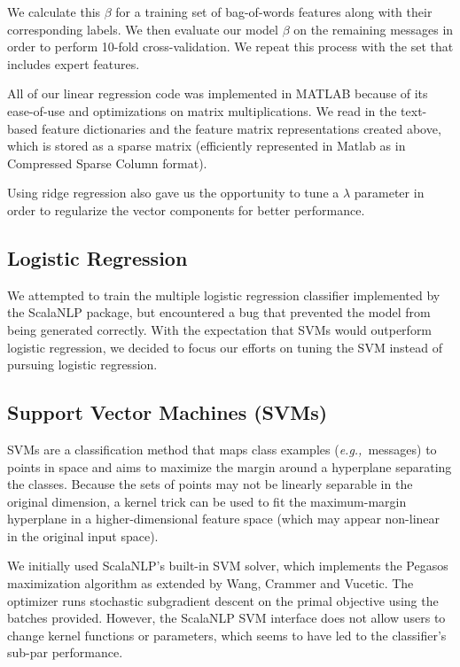 \documentclass[preprint]{acm_proc_article-sp}
\newcommand{\eg}{{\em e.g.,}~}
\begin{document}
We calculate this $\beta$ for a training set of bag-of-words features along with their corresponding labels. 
We then evaluate our model $\beta$ on the remaining messages in order to perform 10-fold cross-validation. 
We repeat this process with the set that includes expert features.

All of our linear regression code was implemented in MATLAB because of its ease-of-use 
and optimizations on matrix multiplications. We read in the text-based feature dictionaries and the feature matrix
representations created above, which is stored as a sparse matrix (efficiently represented in Matlab as 
in Compressed Sparse Column format).

Using ridge regression also gave us the opportunity to tune a $\lambda$ parameter in order to 
regularize the vector components for better performance. 

\subsection{Logistic Regression}

We attempted to train the multiple logistic regression classifier implemented by the ScalaNLP package, 
but encountered a bug that prevented the model from being generated correctly. With the expectation 
that SVMs would outperform logistic regression, we decided to focus our efforts on tuning the SVM 
instead of pursuing logistic regression. 

\subsection{Support Vector Machines (SVMs)}

SVMs are a classification method that maps class examples (\eg messages) to points 
in space and aims to maximize the margin around a hyperplane separating the classes.\cite{boser, cortesv95} 
Because the sets of points may not be linearly separable in the original dimension, a kernel trick can 
be used to fit the maximum-margin hyperplane in a higher-dimensional feature space (which may appear 
non-linear in the original input space).

We initially used ScalaNLP's built-in SVM solver, which implements the Pegasos maximization algorithm\cite{pegasos} 
as extended by Wang, Crammer and Vucetic\cite{wang2}. 
The optimizer runs stochastic subgradient descent on the primal objective 
using the batches provided. However, the ScalaNLP SVM interface does not allow users to change kernel 
functions or parameters, which seems to have led to the classifier's sub-par performance.
\end{document}
